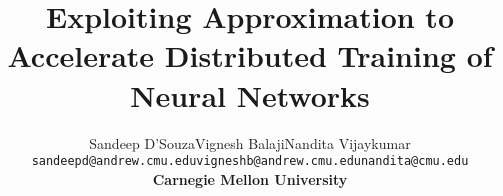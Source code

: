 \documentclass[pageno]{jpaper}
\begin{document}
\title{Exploiting Approximation to Accelerate Distributed Training of Neural Networks}

\DeclareRobustCommand{\authorthing}{
\begin{tabular}[t]{ccc}
Sandeep D'Souza & Vignesh Balaji & Nandita Vijaykumar \\
\texttt{sandeepd@andrew.cmu.edu} & \texttt{vigneshb@andrew.cmu.edu} & \texttt{nandita@cmu.edu}\\
\multicolumn{3}{c}{\textbf{Carnegie Mellon University}}
\end{tabular}
}
\author{\authorthing}

\date{}
\maketitle
\let\oldtabular\tabular
\renewcommand{\tabular}{\footnotesize\oldtabular}

\thispagestyle{empty}














\end{document}
